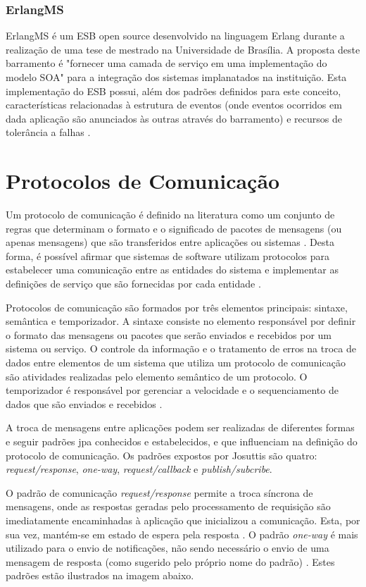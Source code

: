 \subsubsection{ErlangMS}
ErlangMS é um ESB open source desenvolvido na linguagem Erlang durante a realização de uma tese de mestrado na Universidade de Brasília. A proposta deste barramento é "fornecer uma camada de serviço em uma implementação do modelo SOA" para a integração dos sistemas implanatados na instituição. Esta implementação do ESB possui, além dos padrões definidos para este conceito, características relacionadas à estrutura de eventos (onde eventos ocorridos em dada aplicação são anunciados às outras através do barramento) e recursos de tolerância a falhas \cite{agilar_uma_2015}.

\section{Protocolos de Comunicação}
Um protocolo de comunicação é definido na literatura como um conjunto de regras que determinam o formato e o significado de pacotes de mensagens (ou apenas mensagens) que são transferidos entre aplicações ou sistemas \cite{Stallings_2006}. Desta forma, é possível afirmar que sistemas de software utilizam protocolos para estabelecer uma comunicação entre as entidades do sistema e implementar as definições de serviço que são fornecidas por cada entidade \cite{Stallings_2006}.

Protocolos de comunicação são formados por três elementos principais: sintaxe, semântica e temporizador. A sintaxe consiste no elemento responsável por definir o formato das mensagens ou pacotes que serão enviados e recebidos por um sistema ou serviço. O controle da informação e o tratamento de erros na troca de dados entre elementos de um sistema que utiliza um protocolo de comunicação são atividades realizadas pelo elemento semântico de um protocolo. O temporizador é responsável por gerenciar a velocidade e o sequenciamento de dados que são enviados e recebidos \cite{Stallings_2006}.

A troca de mensagens entre aplicações podem ser realizadas de diferentes formas e seguir padrões jpa conhecidos e estabelecidos, e que influenciam na definição do protocolo de comunicação. Os padrões expostos por Josuttis \cite{josuttis_soa_2007} são quatro: \textit{request/response}, \textit{one-way}, \textit{request/callback} e \textit{publish/subcribe}.

O padrão de comunicação \textit{request/response} permite a troca síncrona de mensagens, onde as respostas geradas pelo processamento de requisição são imediatamente encaminhadas à aplicação que inicializou a comunicação. Esta, por sua vez, mantém-se em estado de espera pela resposta \cite{josuttis_soa_2007}. O padrão \textit{one-way} é mais utilizado para o envio de notificações, não sendo necessário o envio de uma mensagem de resposta (como sugerido pelo próprio nome do padrão) \cite{josuttis_soa_2007}. Estes padrões estão ilustrados na imagem abaixo.


